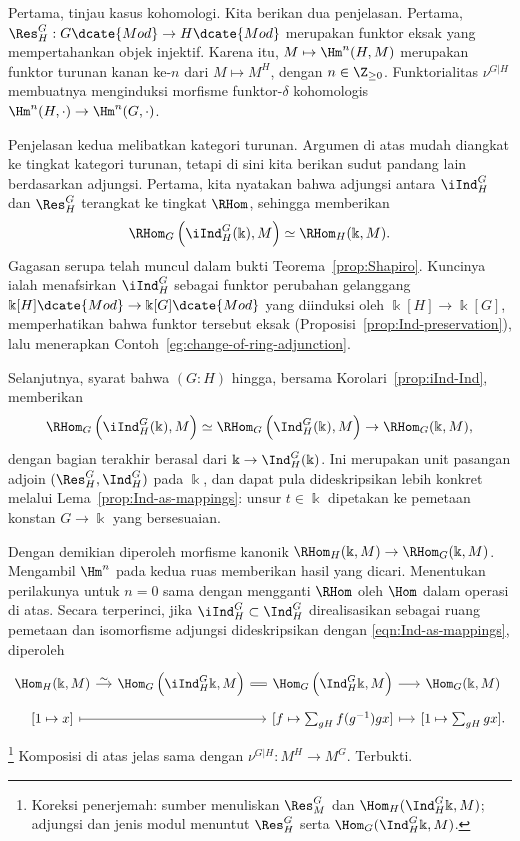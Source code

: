 \begin{bukti}
	Pertama, tinjau kasus kohomologi. Kita berikan dua penjelasan. Pertama,
	$\Res^G_H:G\dcate{Mod}\to H\dcate{Mod}$ merupakan funktor eksak yang
	mempertahankan objek injektif. Karena itu, $M\mapsto\Hm^n(H,M)$ merupakan
	funktor turunan kanan ke-$n$ dari $M\mapsto M^H$, dengan
	$n\in\Z_{\geq0}$. Funktorialitas $\nu^{G|H}$ membuatnya menginduksi
	morfisme funktor-$\delta$ kohomologis
	$\Hm^n(H,\cdot)\to\Hm^n(G,\cdot)$.
	
	Penjelasan kedua melibatkan kategori turunan. Argumen di atas mudah
	diangkat ke tingkat kategori turunan, tetapi di sini kita berikan sudut
	pandang lain berdasarkan adjungsi. Pertama, kita nyatakan bahwa adjungsi
	antara $\iInd^G_H$ dan $\Res^G_H$ terangkat ke tingkat $\RHom$, sehingga
	memberikan
	\[ \RHom_G\left(\iInd^G_H(\Bbbk), M\right) \simeq \RHom_H(\Bbbk, M). \]
	Gagasan serupa telah muncul dalam bukti Teorema~\ref{prop:Shapiro}.
	Kuncinya ialah menafsirkan $\iInd^G_H$ sebagai funktor perubahan gelanggang
	$\Bbbk[H]\dcate{Mod}\to\Bbbk[G]\dcate{Mod}$ yang diinduksi oleh
	$\Bbbk[H]\to\Bbbk[G]$, memperhatikan bahwa funktor tersebut eksak
	(Proposisi~\ref{prop:Ind-preservation}), lalu menerapkan
	Contoh~\ref{eg:change-of-ring-adjunction}.
	
	Selanjutnya, syarat bahwa $(G:H)$ hingga, bersama
	Korolari~\ref{prop:iInd-Ind}, memberikan
	\[ \RHom_G\left(\iInd^G_H(\Bbbk), M\right) \simeq \RHom_G\left( \Ind^G_H(\Bbbk), M \right) \to \RHom_G(\Bbbk, M), \]
	dengan bagian terakhir berasal dari $\Bbbk\to\Ind^G_H(\Bbbk)$. Ini
	merupakan unit pasangan adjoin $(\Res^G_H,\Ind^G_H)$ pada $\Bbbk$, dan
	dapat pula dideskripsikan lebih konkret melalui
	Lema~\ref{prop:Ind-as-mappings}: unsur $t\in\Bbbk$ dipetakan ke pemetaan
	konstan $G\to\Bbbk$ yang bersesuaian.
	
	Dengan demikian diperoleh morfisme kanonik
	$\RHom_H(\Bbbk,M)\to\RHom_G(\Bbbk,M)$. Mengambil $\Hm^n$ pada kedua ruas
	memberikan hasil yang dicari. Menentukan perilakunya untuk $n=0$ sama dengan
	mengganti $\RHom$ oleh $\Hom$ dalam operasi di atas. Secara terperinci,
	jika $\iInd^G_H\subset\Ind^G_H$ direalisasikan sebagai ruang pemetaan dan
	isomorfisme adjungsi dideskripsikan dengan
	\eqref{eqn:Ind-as-mappings}, diperoleh
	\[\begin{tikzcd}[row sep=tiny, column sep=small]
		\Hom_H(\Bbbk, M) \arrow[r, "\sim"] & \Hom_G\left(\iInd^G_H \Bbbk, M\right) \arrow[equal, r] & \Hom_G\left(\Ind^G_H \Bbbk, M\right) \arrow[r] & \Hom_G(\Bbbk, M) \\
		{[1 \mapsto x]} \arrow[mapsto, rr] & & {[f \mapsto \sum_{gH} f(g^{-1}) gx]} \arrow[mapsto, r] & {[1 \mapsto \sum_{gH} gx]}.
	\end{tikzcd}\]
	\footnote{Koreksi penerjemah: sumber menuliskan $\Res^G_M$ dan
	$\Hom_H(\Ind^G_H\Bbbk,M)$; adjungsi dan jenis modul menuntut
	$\Res^G_H$ serta $\Hom_G(\Ind^G_H\Bbbk,M)$.}
	Komposisi di atas jelas sama dengan $\nu^{G|H}:M^H\to M^G$. Terbukti.
\end{bukti}

